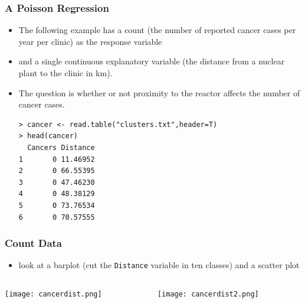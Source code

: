 \begin{frame}[fragile]\frametitle{A Poisson Regression}
  \begin{itemize}
  \item The following example has a count (the number of reported cancer cases per year per clinic) as the response variable
  \item and a single continuous explanatory variable (the distance from a nuclear plant to the clinic in km). 
  \item The question is whether or not proximity to the reactor affects the number of cancer cases.\small
\begin{verbatim}
> cancer <- read.table("clusters.txt",header=T)
> head(cancer)
  Cancers Distance
1       0 11.46952
2       0 66.55395
3       0 47.46230
4       0 48.38129
5       0 73.76534
6       0 70.57555
\end{verbatim}
  \end{itemize}
\end{frame}


\begin{frame}[fragile]\frametitle{Count Data}
  \begin{itemize}
  \item look at a barplot (cut the \texttt{Distance} variable in ten classes) and a scatter plot
  \end{itemize}
  \begin{columns}
    \begin{column}{0.5\textwidth}
\begin{center}
\texttt{[image: cancerdist.png]}
\end{center}
    \end{column}
    \begin{column}{0.5\textwidth}
\begin{center}
\texttt{[image: cancerdist2.png]}
\end{center}
    \end{column}
  \end{columns}

\end{frame}

